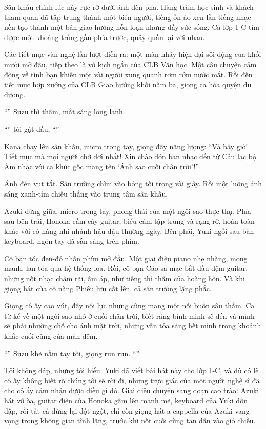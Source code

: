 \documentclass[../main.tex]{subfiles}
\begin{document}
\ct

Sân khấu chính lúc này rực rỡ dưới ánh đèn pha. Hàng trăm học sinh và khách tham quan đã tập trung thành một biển người, tiếng ồn ào xen lẫn tiếng nhạc nền tạo thành một bản giao hưởng hỗn loạn nhưng đầy sức sống. Cả lớp 1-C tìm được một khoảng trống gần phía trước, quây quần lại với nhau.

Các tiết mục văn nghệ lần lượt diễn ra: một màn nhảy hiện đại sôi động của khối mười mở đầu, tiếp theo là vở kịch ngắn của CLB Văn học. Một câu chuyện cảm động về tình bạn khiến một vài người xung quanh rơm rớm nước mắt. Rồi đến tiết mục hợp xướng của CLB Giao hưởng khối năm ba, giọng ca hòa quyện du dương.

``'' Suzu thì thầm, mắt sáng long lanh.

``'' tôi gật đầu, ``''

Kana chạy lên sân khấu, micro trong tay, giọng đầy năng lượng: ``Và bây giờ! Tiết mục mà mọi người chờ đợi nhất! Xin chào đón ban nhạc đến từ Câu lạc bộ Âm nhạc với ca khúc gốc mang tên `Ánh sao cuối chân trời'!''

Ánh đèn vụt tắt. Sân trường chìm vào bóng tối trong vài giây. Rồi một luồng ánh sáng xanh-tím chiếu thẳng vào trung tâm sân khấu.

Azuki đứng giữa, micro trong tay, phong thái của một ngôi sao thực thụ. Phía sau bên trái, Honoka cầm cây guitar, biểu cảm tập trung và rạng rỡ, hoàn toàn khác với cô nàng nhí nhảnh hậu đậu thường ngày. Bên phải, Yuki ngồi sau bàn keyboard, ngón tay đã sẵn sàng trên phím.

Cô bạn tóc đen-đỏ nhấn phím mở đầu. Một giai điệu piano nhẹ nhàng, mong manh, lan tỏa qua hệ thống loa. Rồi, cô bạn Cáo sa mạc bắt đầu đệm guitar, những nốt nhạc chậm rãi, ấm áp, như tiếng thì thầm của hoàng hôn. Và khi giọng hát của cô nàng Phiêu lưu cất lên, cả sân trường lặng phắc.

Giọng cô ấy cao vút, đầy nội lực nhưng cũng mang một nỗi buồn sâu thẳm. Ca từ kể về một ngôi sao nhỏ ở cuối chân trời, biết rằng bình minh sẽ đến và mình sẽ phải nhường chỗ cho ánh mặt trời, nhưng vẫn tỏa sáng hết mình trong khoảnh khắc cuối cùng của màn đêm.

``'' Suzu khẽ nắm tay tôi, giọng run run. ``''

Tôi không đáp, nhưng tôi hiểu. Yuki đã viết bài hát này cho lớp 1-C, và dù có lẽ cô ấy không biết rõ chúng tôi sẽ rời đi, nhưng trực giác của một người nghệ sĩ đã cho cô ấy cảm nhận được điều gì đó. Giai điệu chuyển sang đoạn cao trào: Azuki hát vỡ òa, guitar điện của Honoka gầm lên mạnh mẽ, keyboard của Yuki dồn dập, rồi tất cả dừng lại đột ngột, chỉ còn giọng hát a cappella của Azuki vang vọng trong không gian tĩnh lặng, trước khi nốt cuối cùng tan dần vào gió chiều.
\end{document}
